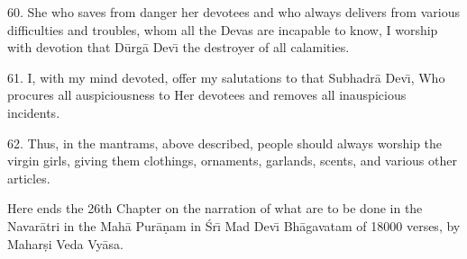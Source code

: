 60. She who saves from danger her devotees and who always delivers from various difficulties and troubles, whom all the Devas are incapable to know, I worship with devotion that D\=urg\=a Dev\={\i} the destroyer of all calamities.

61. I, with my mind devoted, offer my salutations to that Subhadr\=a Dev\={\i}, Who procures all auspiciousness to Her devotees and removes all inauspicious incidents.

62. Thus, in the mantrams, above described, people should always worship the virgin girls, giving them clothings, ornaments, garlands, scents, and various other articles.

Here ends the 26th Chapter on the narration of what are to be done in the Navar\=atri in the Mah\=a Pur\=a\d{n}am in \'Sr\={\i} Mad Dev\={\i} Bh\=agavatam of 18000 verses, by Mahar\d{s}i Veda Vy\=asa.



